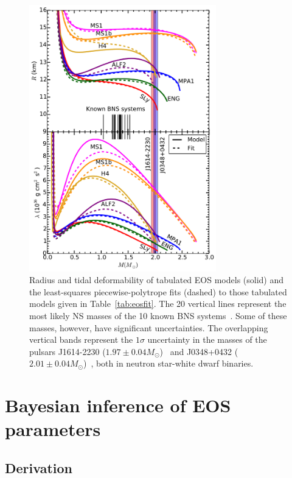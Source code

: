\documentclass[twocolumn,prd,amssymb,aps,nofootinbib,showpacs,epsf]{revtex4}
\begin{document}
\begin{figure}[!htb]
\begin{center}
\includegraphics[width=3.2in]{Radiuslambda.pdf}
\caption{Radius and tidal deformability of tabulated EOS models (solid) and the least-squares piecewise-polytrope fits (dashed) to those tabulated models given in Table~\ref{tab:eosfit}. The 20 vertical lines represent the most likely NS masses of the 10 known BNS systems~\cite{Lattimer2012}. Some of these masses, however, have significant uncertainties. The overlapping vertical bands represent the $1\sigma$ uncertainty in the masses of the pulsars J1614-2230 ($1.97\pm0.04M_\odot$)~\cite{DemorestPennucciRansom2010} and J0348+0432 ($2.01\pm0.04M_\odot$)~\cite{AntoniadisFreireWex2013}, both in neutron star-white dwarf binaries.}
\label{fig:rlofm}
\end{center}
\end{figure}


\section{Bayesian inference of EOS parameters}
\label{sec:bayes}

\subsection{Derivation}
\end{document}

